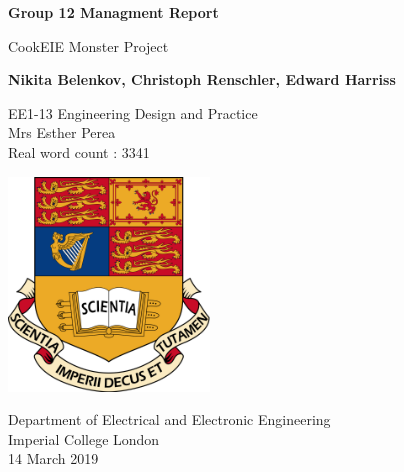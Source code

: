 \begin{titlepage}
    \begin{center}
        \vspace*{1cm}

        \Huge
       \textbf{Group 12 Managment Report}
      
        \LARGE
       \vspace{0.5cm}
        CookEIE Monster Project
        
        \vspace{1.5cm}
        
       \textbf{Nikita Belenkov, Christoph Renschler, Edward Harriss}
        
        \vfill
         EE1-13 Engineering Design and Practice\\
         Mrs Esther Perea\\

        Real word count : 3341 
        
        \vspace{0.8cm}
        
        \includegraphics[width=0.4\textwidth]{university}
        
        \Large
       Department of Electrical and Electronic Engineering\\
       Imperial College London\\
       14 March 2019
        
    \end{center}
\end{titlepage}
